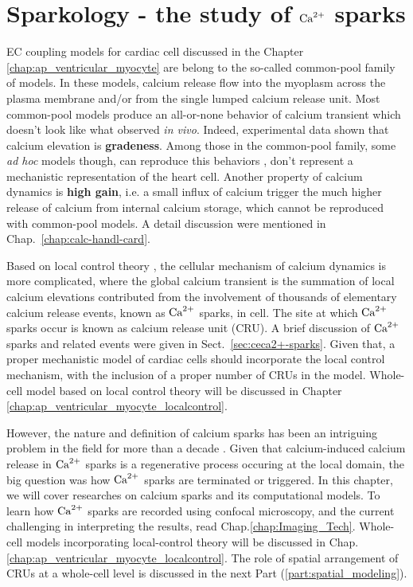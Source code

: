 \chapter{Sparkology - the study of ${\text{Ca}^{2+}}$ sparks}
\label{chap:sparkology-study-ca} 

EC coupling models for cardiac cell discussed in the Chapter
\ref{chap:ap_ventricular_myocyte} are belong to the so-called common-pool family
of models. In these models, calcium release flow into the myoplasm across the
plasma membrane and/or from the single lumped calcium release unit.
Most common-pool models produce an all-or-none behavior of calcium transient
which doesn't look like what observed {\it in vivo}.
Indeed, experimental data shown that calcium elevation is {\bf gradeness}.
Among those in the common-pool family, some {\it ad hoc} models though, can
reproduce this behaviors \citep{luo1994dmc_a, jafri1998cad}, don't represent a
mechanistic representation of the heart cell.
Another property of calcium dynamics is {\bf high gain}, i.e. a small influx of
calcium trigger the much higher release of calcium from internal calcium
storage, which cannot be reproduced with common-pool models. A detail discussion
were mentioned in Chap.~\ref{chap:calc-handl-card}.

 
Based on local control theory \cite{stern1992tec}, the cellular mechanism of 
calcium dynamics is more complicated, where the global calcium transient is the
summation of local calcium elevations contributed from the involvement of
thousands of elementary calcium release events, known as ${\text{Ca}^{2+}}$ sparks, in cell.
The site at which ${\text{Ca}^{2+}}$ sparks occur is known as calcium release unit (CRU). A
brief discussion of ${\text{Ca}^{2+}}$ sparks and related events were given in
Sect.~\ref{sec:ceca2+-sparks}. Given that, a proper mechanistic model of cardiac
cells should incorporate the local control mechanism, with the inclusion of a
proper number of CRUs in the model.
Whole-cell model based on local control theory will be discussed in Chapter
\ref{chap:ap_ventricular_myocyte_localcontrol}.

However, the nature and definition of calcium sparks has been an intriguing
problem in the field for more than a decade \citep{wang2004, shen2004,
niggli2007, cheng2008cs}.
Given that calcium-induced calcium release in ${\text{Ca}^{2+}}$ sparks is a regenerative
process occuring at the local domain, the big question was how ${\text{Ca}^{2+}}$ sparks are
terminated or triggered. In this chapter, we will cover researches on calcium
sparks and its computational models. To learn how ${\text{Ca}^{2+}}$ sparks are recorded
using confocal microscopy, and the current challenging in interpreting the
results, read Chap.\ref{chap:Imaging_Tech}. Whole-cell models incorporating
local-control theory will be discussed in
Chap.\ref{chap:ap_ventricular_myocyte_localcontrol}.
The role of spatial arrangement of CRUs at a whole-cell level is discussed in
the next Part (\ref{part:spatial_modeling}).
 
